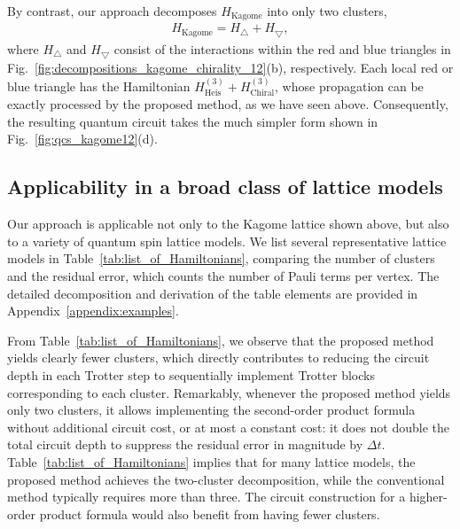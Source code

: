 \documentclass[aps,showpacs,amsmath,amssymb,twocolumn,prx,longbibliography,superscriptaddress,notitlepage,floatfix,10pt]{revtex4-2}
\begin{document}
By contrast, our approach decomposes $H_{\mathrm{Kagome}}$ into only two clusters,
\begin{equation}
\begin{split}
    H_{\mathrm{Kagome}} = H_{\bigtriangleup} + H_{\bigtriangledown},
\end{split}
\end{equation}
where $H_{\bigtriangleup}$ and $H_{\bigtriangledown}$ consist of the interactions within the red and blue triangles in Fig.~\ref{fig:decompositions_kagome_chirality_12}(b), respectively.
Each local red or blue triangle has the Hamiltonian $H_{\mathrm{Heis}}^{(3)} + H_{\mathrm{Chiral}}^{(3)}$, whose propagation can be exactly processed by the proposed method, as we have seen above.
Consequently, the resulting quantum circuit takes the much simpler form shown in Fig.~\ref{fig:qcs_kagome12}(d).


\subsection{Applicability in a broad class of lattice models}

Our approach is applicable not only to the Kagome lattice shown above, but also to a variety of quantum spin lattice models.
We list several representative lattice models in Table~\ref{tab:list_of_Hamiltonians}, comparing the number of clusters and the residual error, which counts the number of Pauli terms per vertex.
The detailed decomposition and derivation of the table elements are provided in Appendix~\ref{appendix:examples}.

From Table~\ref{tab:list_of_Hamiltonians}, we observe that the proposed method yields clearly fewer clusters, which directly contributes to reducing the circuit depth in each Trotter step to sequentially implement Trotter blocks corresponding to each cluster.
Remarkably, whenever the proposed method yields only two clusters, it allows implementing the second-order product formula without additional circuit cost, or at most a constant cost: it does not double the total circuit depth to suppress the residual error in magnitude by $\Delta t$.
Table~\ref{tab:list_of_Hamiltonians} implies that for many lattice models, the proposed method achieves the two-cluster decomposition, while the conventional method typically requires more than three.
The circuit construction for a higher-order product formula would also benefit from having fewer clusters.
\end{document}
